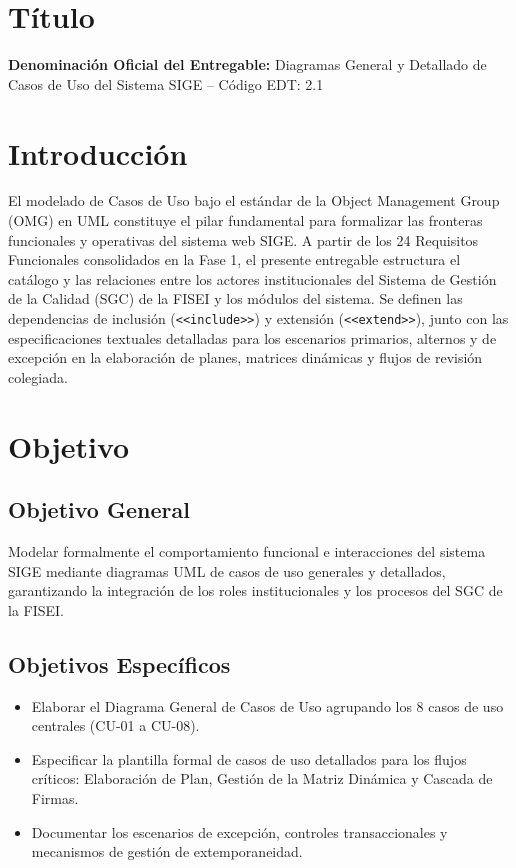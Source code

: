 \documentclass[12pt,a4paper]{article}
\begin{document}
\section{Título}
\textbf{Denominación Oficial del Entregable:} Diagramas General y Detallado de Casos de Uso del Sistema SIGE -- Código EDT: 2.1

\section{Introducción}
El modelado de Casos de Uso bajo el estándar de la Object Management Group (OMG) en UML constituye el pilar fundamental para formalizar las fronteras funcionales y operativas del sistema web SIGE. A partir de los 24 Requisitos Funcionales consolidados en la Fase 1, el presente entregable estructura el catálogo y las relaciones entre los actores institucionales del Sistema de Gestión de la Calidad (SGC) de la FISEI y los módulos del sistema. Se definen las dependencias de inclusión (\texttt{<<include>>}) y extensión (\texttt{<<extend>>}), junto con las especificaciones textuales detalladas para los escenarios primarios, alternos y de excepción en la elaboración de planes, matrices dinámicas y flujos de revisión colegiada.

\section{Objetivo}
\subsection{Objetivo General}
Modelar formalmente el comportamiento funcional e interacciones del sistema SIGE mediante diagramas UML de casos de uso generales y detallados, garantizando la integración de los roles institucionales y los procesos del SGC de la FISEI.
\subsection{Objetivos Específicos}
\begin{itemize}[leftmargin=1.5em, itemsep=2pt]
    \item Elaborar el Diagrama General de Casos de Uso agrupando los 8 casos de uso centrales (CU-01 a CU-08).
    \item Especificar la plantilla formal de casos de uso detallados para los flujos críticos: Elaboración de Plan, Gestión de la Matriz Dinámica y Cascada de Firmas.
    \item Documentar los escenarios de excepción, controles transaccionales y mecanismos de gestión de extemporaneidad.
\end{itemize}
\end{document}

